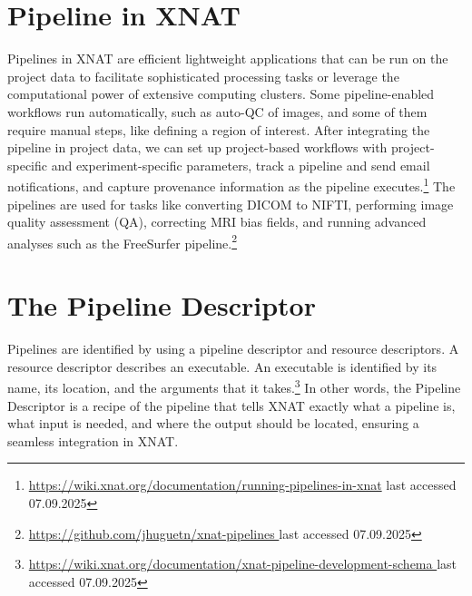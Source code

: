 \section{Pipeline in XNAT}
Pipelines in XNAT are efficient lightweight applications that can be run on the project data to facilitate sophisticated processing tasks or leverage the computational power of extensive computing clusters. Some pipeline-enabled workflows run automatically, such as auto-QC of images, and some of them require manual steps, like defining a region of interest. After integrating the pipeline in project data, we can set up project-based workflows with project-specific and experiment-specific parameters, track a pipeline and send email notifications, and capture provenance information as the pipeline executes.\footnote{\url{https://wiki.xnat.org/documentation/running-pipelines-in-xnat} { last accessed 07.09.2025}} The pipelines are used for tasks like converting DICOM to NIFTI, performing image quality assessment (QA), correcting MRI bias fields, and running advanced analyses such as the FreeSurfer pipeline.\footnote{\url{https://github.com/jhuguetn/xnat-pipelines }{ last accessed 07.09.2025}}

\section{The Pipeline Descriptor}

Pipelines are identified by using a pipeline descriptor and resource descriptors. A resource descriptor describes an executable. An executable is identified by its name, its location, and the arguments that it takes.\footnote{\url{https://wiki.xnat.org/documentation/xnat-pipeline-development-schema }{ last accessed 07.09.2025}} In other words, the Pipeline Descriptor is a recipe of the pipeline that tells XNAT exactly what a pipeline is, what input is needed, and where the output should be located, ensuring a seamless integration in XNAT.








